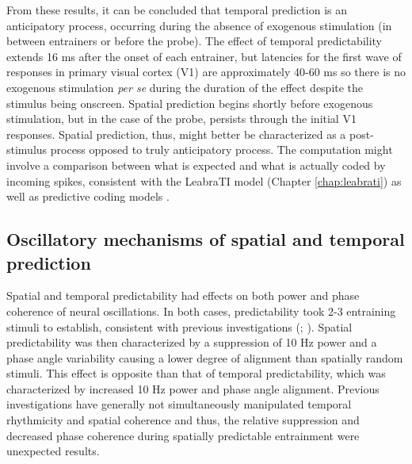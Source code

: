 \documentclass[dwyatte_dissertation.tex]{subfiles}
\begin{document}
From these results, it can be concluded that temporal prediction is an anticipatory process, occurring during the absence of exogenous stimulation (in between entrainers or before the probe). The effect of temporal predictability extends 16 ms after the onset of each entrainer, but latencies for the first wave of responses in primary visual cortex (V1) are approximately 40-60 ms \cite{NowakBullier97,FoxeSimpson02} so there is no exogenous stimulation \textit{per se} during the duration of the effect despite the stimulus being onscreen. Spatial prediction begins shortly before exogenous stimulation, but in the case of the probe, persists through the initial V1 responses. Spatial prediction, thus, might better be characterized as a post-stimulus process opposed to truly anticipatory process. The computation might involve a comparison between what is expected and what is actually coded by incoming spikes, consistent with the LeabraTI model (Chapter \ref{chap:leabrati}) as well as predictive coding models \cite[e.g.,]{RaoBallard99}.

\subsection{Oscillatory mechanisms of spatial and temporal prediction}
Spatial and temporal predictability had effects on both power and phase coherence of neural oscillations. In both cases, predictability took 2-3 entraining stimuli to establish, consistent with previous investigations (; ). Spatial predictability was then characterized by a suppression of 10 Hz power and a phase angle variability causing a lower degree of alignment than spatially random stimuli. This effect is opposite than that of temporal predictability, which was characterized by increased 10 Hz power and phase angle alignment. Previous investigations have generally not simultaneously manipulated temporal rhythmicity and spatial coherence \cite[although see]{DohertyRaoMesulamEtAl05,RohenkohlGouldPessoaEtAl14} and thus, the relative suppression and decreased phase coherence during spatially predictable entrainment were unexpected results.
\end{document}
